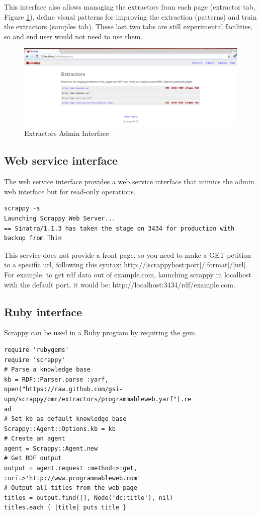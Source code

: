 This interface also allows managing the extractors from each page (extractor tab, Figure \ref{fig:scrappyextractors}),
define visual patterns for improving the extraction (patterns) and train the extractors (samples
tab). These last two tabs are still experimental facilities, so and end user would not need to
use them.

\begin{figure}[h]
	\centering
	\includegraphics[width=400pt]{graphics/scrappy-extractors-interface.png}
	\caption{Extractors Admin Interface}
	\label{fig:scrappyextractors}
\end{figure}

\subsection{Web service interface}
The web service interface provides a web service interface that mimics the admin web
interface but for read-only operations.

\begin{lstlisting}[style=consola, numbers=none]
scrappy -s
Launching Scrappy Web Server...
== Sinatra/1.1.3 has taken the stage on 3434 for production with backup from Thin
\end{lstlisting}

This service does not provide a front page, so you need to make a GET petition to a specific
url, following this syntax: http://[scrappyhost:port]/[format]/[url]. For example, to get rdf data
out of example.com, launching scrappy in localhost with the default port, it would be:
http://localhost:3434/rdf/example.com.

\subsection{Ruby interface}
Scrappy can be used in a Ruby program by requiring the gem.

\begin{lstlisting}[style=consola]
require 'rubygems'
require 'scrappy'
# Parse a knowledge base
kb = RDF::Parser.parse :yarf,
open("https://raw.github.com/gsi-upm/scrappy/omr/extractors/programmableweb.yarf").re
ad
# Set kb as default knowledge base
Scrappy::Agent::Options.kb = kb
# Create an agent
agent = Scrappy::Agent.new
# Get RDF output
output = agent.request :method=>:get, :uri=>'http://www.programmableweb.com'
# Output all titles from the web page
titles = output.find([], Node('dc:title'), nil)
titles.each { |title| puts title }
\end{lstlisting}

